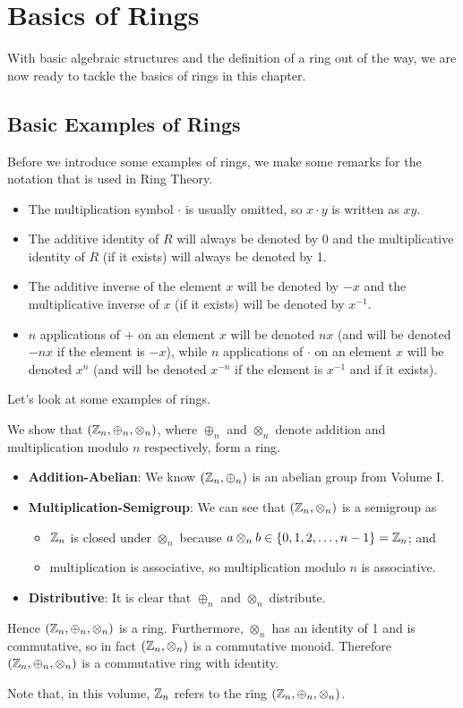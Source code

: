 \chapter{Basics of Rings}
With basic algebraic structures and the definition of a ring out of the way, we are now ready to tackle the basics of rings in this chapter.

\section{Basic Examples of Rings}
Before we introduce some examples of rings, we make some remarks for the notation that is used in Ring Theory.
\begin{itemize}
    \item The multiplication symbol $\cdot$ is usually omitted, so $x \cdot y$ is written as $xy$.
    \item The additive identity of $R$ will always be denoted by 0 and the multiplicative identity of $R$ (if it exists) will always be denoted by 1.
    \item The additive inverse of the element $x$ will be denoted by $-x$ and the multiplicative inverse of $x$ (if it exists) will be denoted by $x^{-1}$.
    \item $n$ applications of $+$ on an element $x$ will be denoted $nx$ (and will be denoted $-nx$ if the element is $-x$), while $n$ applications of $\cdot$ on an element $x$ will be denoted $x^n$ (and will be denoted $x^{-n}$ if the element is $x^{-1}$ and if it exists).
\end{itemize}

Let's look at some examples of rings.
\begin{example}
    We show that $(\mathbb{Z}_n, \oplus_n, \otimes_n)$, where $\oplus_n$ and $\otimes_n$ denote addition and multiplication modulo $n$ respectively, form a ring.
    \begin{itemize}
        \item \textbf{Addition-Abelian}: We know $(\mathbb{Z}_n, \oplus_n)$ is an abelian group from Volume I.
        \item \textbf{Multiplication-Semigroup}: We can see that $(\mathbb{Z}_n, \otimes_n)$ is a semigroup as
        \begin{itemize}
            \item $\mathbb{Z}_n$ is closed under $\otimes_n$ because $a \otimes_n b \in \{0, 1, 2, \dots, n-1\} = \mathbb{Z}_n$; and
            \item multiplication is associative, so multiplication modulo $n$ is associative.
        \end{itemize}
        \item \textbf{Distributive}: It is clear that $\oplus_n$ and $\otimes_n$ distribute.
    \end{itemize}
    Hence $(\mathbb{Z}_n, \oplus_n, \otimes_n)$ is a ring. Furthermore, $\otimes_n$ has an identity of 1 and is commutative, so in fact $(\mathbb{Z}_n, \otimes_n)$ is a commutative monoid. Therefore $(\mathbb{Z}_n, \oplus_n, \otimes_n)$ is a commutative ring with identity.

    Note that, in this volume, $\mathbb{Z}_n$ refers to the ring $(\mathbb{Z}_n, \oplus_n, \otimes_n)$.
\end{example}

